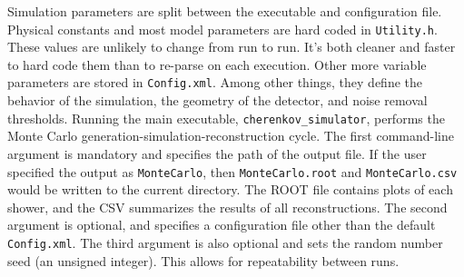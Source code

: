 Simulation parameters are split between the executable and configuration file. Physical constants and most model parameters are hard coded in \texttt{Utility.h}. These values are unlikely to change from run to run. It's both cleaner and faster to hard code them than to re-parse on each execution. Other more variable parameters are stored in \texttt{Config.xml}. Among other things, they define the behavior of the simulation, the geometry of the detector, and noise removal thresholds. Running the main executable, \texttt{cherenkov\_simulator}, performs the Monte Carlo generation-simulation-reconstruction cycle. The first command-line argument is mandatory and specifies the path of the output file. If the user specified the output as \texttt{MonteCarlo}, then \texttt{MonteCarlo.root} and \texttt{MonteCarlo.csv} would be written to the current directory. The ROOT file contains plots of each shower, and the CSV summarizes the results of all reconstructions. The second argument is optional, and specifies a configuration file other than the default \texttt{Config.xml}. The third argument is also optional and sets the random number seed (an unsigned integer). This allows for repeatability between runs.

